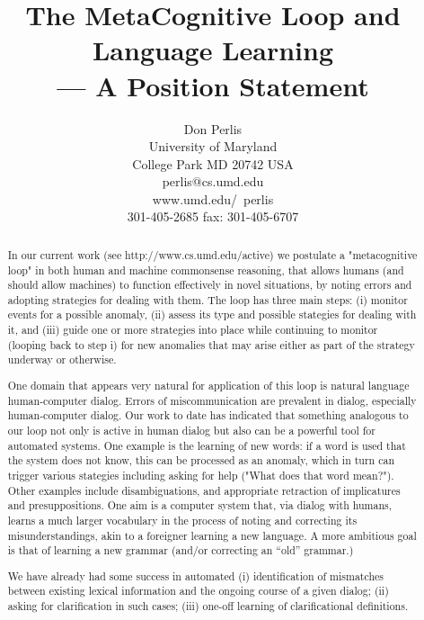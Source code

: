 \documentclass[fullpage]{article}
\title{\bf The MetaCognitive Loop and Language Learning\\
	--- A Position Statement}
\author{Don Perlis\\
        University of Maryland\\
        College Park MD 20742 USA\\
        perlis@cs.umd.edu\\
        www.umd.edu/~perlis\\
        301-405-2685
        fax: 301-405-6707}
\begin{document}
\maketitle

\begin{abstract}

In our current work (see http://www.cs.umd.edu/active) 
we postulate a "metacognitive loop" in both human and machine
commonsense reasoning, that allows humans (and should allow
machines) to function effectively in novel situations, by noting
 errors and adopting strategies for dealing with them.  The loop
 has three main steps: (i) monitor events for a possible anomaly,
 (ii) assess its type and possible stategies for dealing with it,
 and (iii) guide one or more strategies into place while continuing
 to monitor (looping back to step i) for new anomalies that may
 arise either as part of the strategy underway or otherwise.

 One domain that appears very natural for application of this loop
 is natural language human-computer dialog.  Errors of miscommunication
 are prevalent in dialog, especially human-computer dialog.  Our work
 to date has indicated that something analogous to our loop not only
 is active in human dialog but also can be a powerful tool for automated
 systems.  One example is the learning of new words: if a word is used
 that the system does not know, this can be processed as an anomaly,
 which in turn can trigger various stategies including asking for help
 ("What does that word mean?").  Other examples include disambiguations,
 and appropriate retraction of implicatures and presuppositions.  One
 aim is a computer system that, via dialog with humans, learns
 a much larger vocabulary in the process of noting and correcting its
 misunderstandings, akin to a foreigner learning a new language.  A
 more ambitious goal is that of learning a new grammar (and/or
 correcting an  ``old'' grammar.)

We have already had some success in automated (i) identification of
mismatches between existing lexical information and the ongoing course
of a given dialog; (ii) asking for clarification in such cases; (iii)
one-off learning of clarificational definitions.


\end{abstract}








\end{document}
